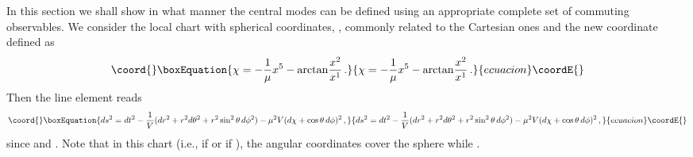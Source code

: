 \documentclass[a4paper,12pt]{article}
\begin{document}
In this section we shall show in what manner the central modes can be 
defined using  an appropriate complete set of commuting observables. 
We  consider the local chart with spherical coordinates,  \coordHE{}, 
commonly related to the Cartesian ones  and the new coordinate \myHighlight{$\chi$}\coordHE{} 
defined as 
\begin{equation}\coord{}\boxEquation{
\chi=-\frac{1}{\mu}x^{5}-{\rm arctan}\frac{x^2}{x^1}\,.
}{
\chi=-\frac{1}{\mu}x^{5}-{\rm arctan}\frac{x^2}{x^1}\,.
}{ecuacion}\coordE{}\end{equation}
Then the line element reads 
\begin{equation}\coord{}\boxEquation{
ds^{2}=dt^{2}-\frac{1}{V}(dr^{2}+r^{2}d\theta^{2}+ 
r^{2}\sin^{2}\theta\, d\phi^{2})-\mu^{2}V(d\chi+\cos\theta\, d\phi)^{2}\,,  
}{
ds^{2}=dt^{2}-\frac{1}{V}(dr^{2}+r^{2}d\theta^{2}+ 
r^{2}\sin^{2}\theta\, d\phi^{2})-\mu^{2}V(d\chi+\cos\theta\, d\phi)^{2}\,,  
}{ecuacion}\coordE{}\end{equation}
since \coordHE{} and \coordHE{}. Note that in 
this chart   \coordHE{} (i.e., \coordHE{} if \coordHE{} or \coordHE{} if 
\coordHE{}), the angular coordinates \myHighlight{$\theta,\,\phi$}\coordHE{} cover the sphere \coordHE{} 
while \myHighlight{$\chi\in D_{\chi}=[0,4\pi)$}\coordHE{}. 
\end{document}
